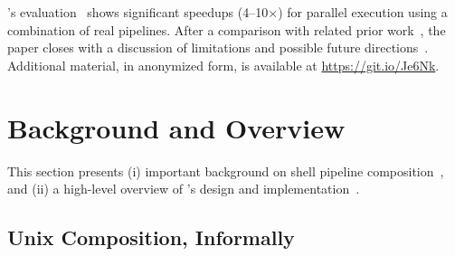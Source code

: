 \documentclass[sigplan,10pt,review,anonymous]{acmart}
\begin{document}
\noindent
\sys's evaluation~ shows significant speedups (4--10$\times$) for parallel execution using a combination of real pipelines. %
After a comparison with related prior work~, the paper closes with a discussion of limitations and possible future directions~.
Additional material, in anonymized form, is available at
\href{https://git.io/Je6Nk}{https://git.io/Je6Nk}.

% 

\section{Background and Overview}
\label{bg}

This section presents (i) important background on shell pipeline composition~, and (ii) a high-level overview of \sys's design and implementation~.

\subsection{Unix Composition, Informally}
\label{bg:pipelines}
\end{document}
